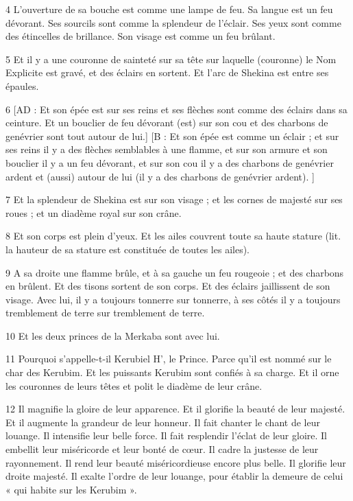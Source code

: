 \par 4 L'ouverture de sa bouche est comme une lampe de feu. Sa langue est un feu dévorant. Ses sourcils sont comme la splendeur de l'éclair. Ses yeux sont comme des étincelles de brillance. Son visage est comme un feu brûlant.

\par 5 Et il y a une couronne de sainteté sur sa tête sur laquelle (couronne) le Nom Explicite est gravé, et des éclairs en sortent. Et l'arc de Shekina est entre ses épaules.

\par 6 [AD : Et son épée est sur ses reins et ses flèches sont comme des éclairs dans sa ceinture. Et un bouclier de feu dévorant (est) sur son cou et des charbons de genévrier sont tout autour de lui.] [B : Et son épée est comme un éclair ; et sur ses reins il y a des flèches semblables à une flamme, et sur son armure et son bouclier il y a un feu dévorant, et sur son cou il y a des charbons de genévrier ardent et (aussi) autour de lui (il y a des charbons de genévrier ardent). ]

\par 7 Et la splendeur de Shekina est sur son visage ; et les cornes de majesté sur ses roues ; et un diadème royal sur son crâne.

\par 8 Et son corps est plein d'yeux. Et les ailes couvrent toute sa haute stature (lit. la hauteur de sa stature est constituée de toutes les ailes).

\par 9 A sa droite une flamme brûle, et à sa gauche un feu rougeoie ; et des charbons en brûlent. Et des tisons sortent de son corps. Et des éclairs jaillissent de son visage. Avec lui, il y a toujours tonnerre sur tonnerre, à ses côtés il y a toujours tremblement de terre sur tremblement de terre.

\par 10 Et les deux princes de la Merkaba sont avec lui.

\par 11 Pourquoi s'appelle-t-il Kerubiel H', le Prince. Parce qu'il est nommé sur le char des Kerubim. Et les puissants Kerubim sont confiés à sa charge. Et il orne les couronnes de leurs têtes et polit le diadème de leur crâne.

\par 12 Il magnifie la gloire de leur apparence. Et il glorifie la beauté de leur majesté. Et il augmente la grandeur de leur honneur. Il fait chanter le chant de leur louange. Il intensifie leur belle force. Il fait resplendir l’éclat de leur gloire. Il embellit leur miséricorde et leur bonté de cœur. Il cadre la justesse de leur rayonnement. Il rend leur beauté miséricordieuse encore plus belle. Il glorifie leur droite majesté. Il exalte l'ordre de leur louange, pour établir la demeure de celui « qui habite sur les Kerubim ».

